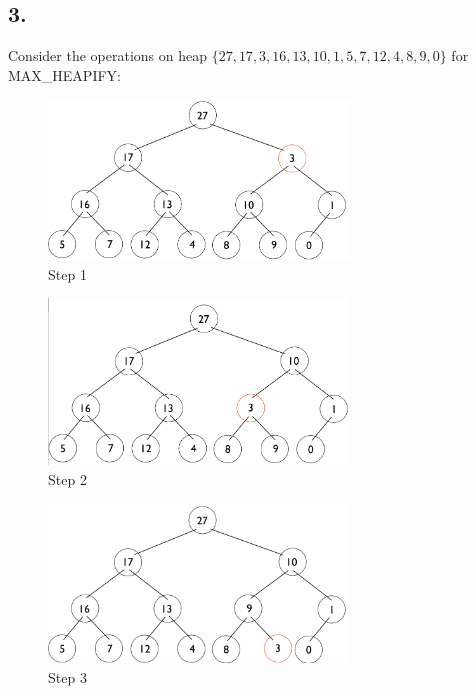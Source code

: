 \documentclass[11pt,letterpaper]{article}
\begin{document}
\subsection*{3.}
Consider the operations on heap $ \{27,17,3,16,13,10,1,5,7,12,4,8,9,0\} $ for MAX\_HEAPIFY:

\begin{figure}[!h]

	\begin{center}
	\includegraphics[width=80mm]{images/6_2_1_1_tree.png}
	\end{center}

\caption{Step 1 }
\end{figure}

\begin{figure}[!h]

	\begin{center}
	\includegraphics[width=80mm]{images/6_2_1_2_tree.png}
	\end{center}

\caption{Step 2 }
\end{figure}

\pagebreak

\begin{figure}[!h]

	\begin{center}
	\includegraphics[width=80mm]{images/6_2_1_3_tree.png}
	\end{center}

\caption{Step 3 }
\end{figure}
\end{document}
